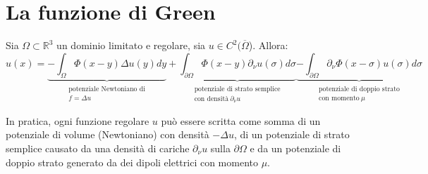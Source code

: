 \documentclass[10pt,a4paper,twoside,openright]{book}
\begin{document}
\section{La funzione di Green}
\begin{theorem}
	Sia $\displaystyle \Omega \subset \mathbb{R}^{3}$ un dominio limitato e regolare, sia $\displaystyle u\in C^{2}(\overline{\Omega }$). Allora:
	\begin{equation*}
		u(x) =\underbrace{-\int _{\Omega } \Phi (x-y) \Delta u(y) dy}_{ \begin{array}{l}
			\text{potenziale Newtoniano di}\\
			f=\Delta u
			\end{array}} +\underbrace{\int _{\partial \Omega } \Phi (x-y) \partial _{\nu } u(\sigma) d\sigma }_{ \begin{array}{l}
			\text{potenziale di strato semplice}\\
			\text{con densità} \ \partial _{\nu } u
			\end{array}}\underbrace{-\int _{\partial \Omega } \partial _{\nu } \Phi (x-\sigma) u(\sigma) d\sigma }_{ \begin{array}{l}
			\text{potenziale di doppio strato}\\
			\text{con momento} \ \mu 
			\end{array}}
	\end{equation*}
\end{theorem}
In pratica, ogni funzione regolare $\displaystyle u$ può essere scritta come somma di un potenziale di volume (Newtoniano) con densità $\displaystyle -\Delta u$, di un potenziale di strato semplice causato da una densità di cariche $\displaystyle \partial _{\nu } u$ sulla $\displaystyle \partial \Omega $ e da un potenziale di doppio strato generato da dei dipoli elettrici con momento $\displaystyle \mu $.
\end{document}
